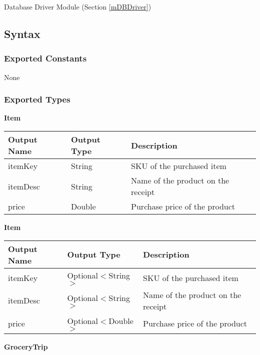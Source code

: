 \documentclass[12pt, titlepage]{article}
\begin{document}
Database Driver Module (Section \ref{mDBDriver})

\subsection{Syntax}

\subsubsection{Exported Constants}

None

\subsubsection{Exported Types}

\textbf{Item}

\begin{table}[H]
  \begin{tabular}{|p{}|p{}|p{}|}
    \hline
    \textbf{Output Name} & \textbf{Output Type} & \textbf{Description} \\
    \hline
    itemKey & String & SKU of the purchased item \\
    \hline
    itemDesc & String & Name of the product on the receipt \\
    \hline
    price & Double & Purchase price of the product \\
    \hline
  \end{tabular}
\end{table}

\textbf{Item}

\begin{table}[H]
  \begin{tabular}{|p{}|p{}|p{}|}
    \hline
    \textbf{Output Name} & \textbf{Output Type} & \textbf{Description} \\
    \hline
    itemKey & Optional$<$String$>$ & SKU of the purchased item \\
    \hline
    itemDesc & Optional$<$String$>$ & Name of the product on the receipt \\
    \hline
    price & Optional$<$Double$>$ & Purchase price of the product \\
    \hline
  \end{tabular}
\end{table}

\textbf{GroceryTrip}
\end{document}
